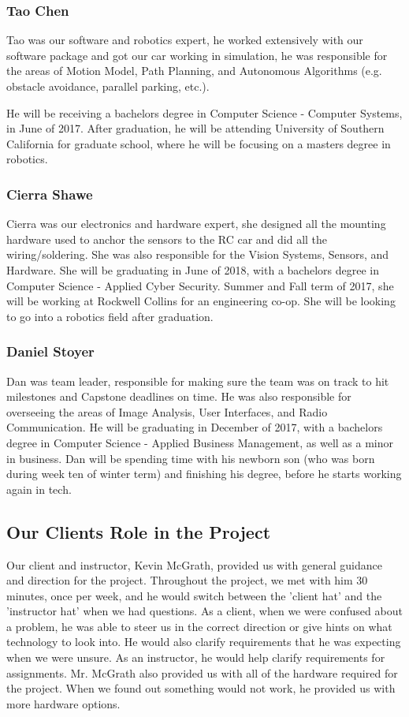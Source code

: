 \documentclass[compsoc,draftclsnofoot,onecolumn,10pt]{IEEEtran}
\begin{document}
\subsubsection*{Tao Chen}
Tao was our software and robotics expert, he worked extensively with our software package and got our car working in simulation, he was responsible for the areas of Motion Model, Path Planning, and Autonomous Algorithms (e.g. obstacle avoidance, parallel parking, etc.).\par
He will be receiving a bachelors degree in Computer Science - Computer Systems, in June of 2017. After graduation, he will be attending University of Southern California for graduate school, where he will be focusing on a masters degree in robotics. 

\subsubsection*{Cierra Shawe}
Cierra was our electronics and hardware expert, she designed all the mounting hardware used to anchor the sensors to the RC car and did all the wiring/soldering. She was also responsible for the Vision Systems, Sensors, and Hardware. She will be graduating in June of 2018, with a bachelors degree in Computer Science - Applied Cyber Security. Summer and Fall term of 2017, she will be working at Rockwell Collins for an engineering co-op. She will be looking to go into a robotics field after graduation. 

\subsubsection*{Daniel Stoyer}
Dan was team leader, responsible for making sure the team was on track to hit milestones and Capstone deadlines on time. He was also responsible for overseeing the areas of Image Analysis, User Interfaces, and Radio Communication. He will be graduating in December of 2017, with a bachelors degree in Computer Science - Applied Business Management, as well as a minor in business. Dan will be spending time with his newborn son (who was born during week ten of winter term) and finishing his degree, before he starts working again in tech. 

\subsection{Our Clients Role in the Project}
Our client and instructor, Kevin McGrath, provided us with general guidance and direction for the project. 
Throughout the project, we met with him 30 minutes, once per week, and he would switch between the 'client hat' and the 'instructor hat' when we had questions. 
As a client, when we were confused about a problem, he was able to steer us in the correct direction or give hints on what technology to look into.
He would also clarify requirements that he was expecting when we were unsure. 
As an instructor, he would help clarify requirements for assignments. 
Mr. McGrath also provided us with all of the hardware required for the project. When we found out something would not work, he provided us with more hardware options. 
\end{document}
